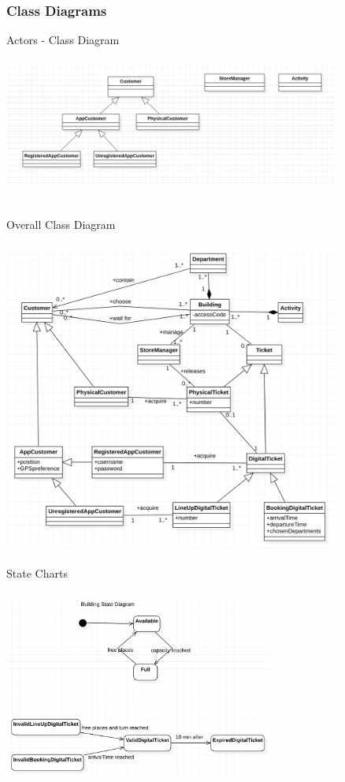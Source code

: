 \documentclass{article}
\begin{document}
	\subsubsection{Class Diagrams}
	\large{Actors - Class Diagram} \\
	\\
	\includegraphics[height=4cm]{ActorsClassDiagram}\\
	\\
	\\
	\large{Overall Class Diagram} \\
	\\
	\includegraphics[height=10cm]{ClassDiagram}\\
	\\
	\large{State Charts} \\
	\\
	\includegraphics[height=6cm]{StateDiagram}\\
	
\end{document}
